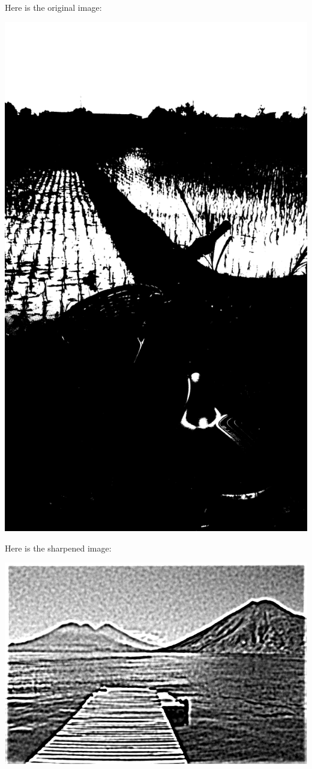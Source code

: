 \documentclass[11pt]{article}
\begin{document}
Here is the original image:
\begin{center}
\includegraphics[width=.9\linewidth]{ENG204-Assignment-3-Original.png}
\end{center}
Here is the sharpened image:
\begin{center}
\includegraphics[width=.9\linewidth]{ENG204-Assignment-3-Sharpened.png}
\end{center}
\end{document}
